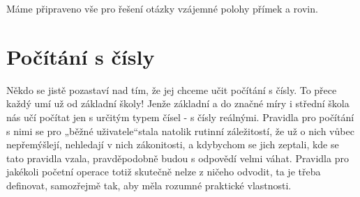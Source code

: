       
      
      
  
      Máme připraveno vše pro řešení otázky vzájemné polohy přímek a rovin.

      

      
      
      
      
  \section{Počítání s čísly}\label{mai:IchapIIsecII}
    Někdo se jistě pozastaví nad tím, že jej chceme učit počítání s čísly. To přece každý umí už od
    základní školy! Jenže základní a do značné míry i střední škola nás učí počítat jen s určitým
    typem čísel - s čísly reálnými. Pravidla pro počítání s nimi se pro „běžné uživatele“stala
    natolik rutinní záležitostí, že už o nich vůbec nepřemýšlejí, nehledají v nich zákonitosti, a
    kdybychom se jich zeptali, kde se tato pravidla vzala, pravděpodobně budou s odpovědí velmi
    váhat. Pravidla pro jakékoli početní operace totiž skutečně nelze z ničeho odvodit, ta je třeba
    definovat, samozřejmě tak, aby měla rozumné praktické vlastnosti.
    
